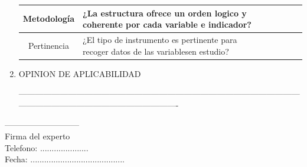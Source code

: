 \documentclass[12pt,a4paper]{article}
\begin{document}
\begin{enumerate}
\begin{center}
\begin{tabular}{|c|p{6.8cm}|c|c|c|c|}
			      Metodología                        & ¿La estructura ofrece un orden logico y coherente por cada variable e indicador?     &                            &                            &   &   \\
			      \hline
			      Pertinencia                        & ¿El tipo de instrumento es pertinente para recoger datos de las variablesen estudio? &                            &                            &   &   \\
			      \hline
		      \end{tabular}
	      \end{center}

	\item OPINION DE APLICABILIDAD

	      ----------------------------------------------------------------------------------------------------------------------------------------------------------------
\end{enumerate}

\begin{center}

	---------------------------\\
	Firma del experto\\
	Telefono: .....................\\
	Fecha: .........................................
\end{center}
\end{document}

